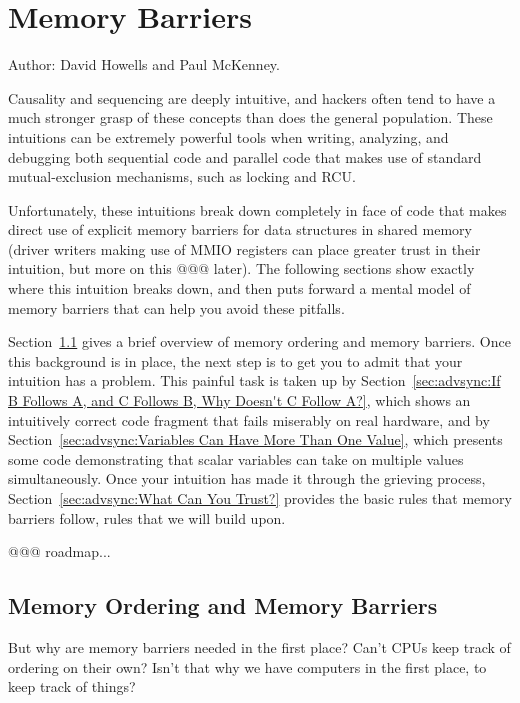 
\section{Memory Barriers}
\label{sec:advsync:Memory Barriers}

Author: David Howells and Paul McKenney.

Causality and sequencing are deeply intuitive, and hackers often
tend to have a much stronger grasp of these concepts than does
the general population.
These intuitions can be extremely powerful tools when writing, analyzing,
and debugging both sequential code and parallel code that makes
use of standard mutual-exclusion mechanisms, such as locking and
RCU.

Unfortunately, these intuitions break down completely in face of
code that makes direct use of explicit memory barriers for data structures
in shared memory (driver writers making use of MMIO registers can
place greater trust in their intuition, but more on this @@@ later).
The following sections show exactly where this intuition breaks down,
and then puts forward a mental model of memory barriers that can help
you avoid these pitfalls.

Section~\ref{sec:advsync:Memory Ordering and Memory Barriers}
gives a brief overview of memory ordering and memory barriers.
Once this background is in place, the next step is to get you to admit
that your intuition has a problem.
This painful task is taken up by
Section~\ref{sec:advsync:If B Follows A, and C Follows B, Why Doesn't C Follow A?},
which shows an intuitively correct code fragment that fails miserably
on real hardware, and by
Section~\ref{sec:advsync:Variables Can Have More Than One Value},
which presents some code demonstrating that scalar variables can
take on multiple values simultaneously.
Once your intuition has made it through the grieving process,
Section~\ref{sec:advsync:What Can You Trust?}
provides the basic rules that memory barriers follow, rules that we
will build upon.

@@@ roadmap...

\subsection{Memory Ordering and Memory Barriers}
\label{sec:advsync:Memory Ordering and Memory Barriers}

But why are memory barriers needed in the first place?
Can't CPUs keep track of ordering on their own?
Isn't that why we have computers in the first place, to keep track of things?


